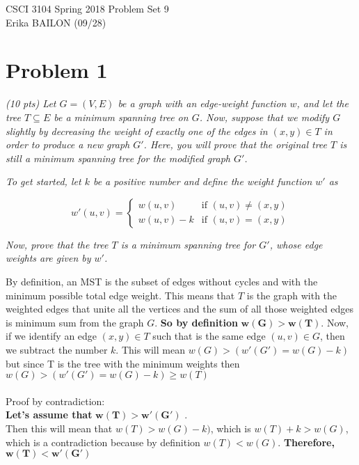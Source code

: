 \documentclass[12pt]{article} \setlength{\oddsidemargin}{0in}
\begin{document}
\noindent CSCI 3104 Spring 2018 \hfill Problem Set 9\\
Erika BAILON (09/28)

\graphicspath{ {\string~/Desktop/images/} }

\hrulefill

{\selectfont}

\section*{Problem 1}

\textit{(10 pts) Let $G = (V, E)$ be a graph with an edge-weight function $w$, and let the tree
$T \subseteq E$ be a minimum spanning tree on $G$. Now, suppose that we modify $G$ slightly by
decreasing the weight of exactly one of the edges in $(x, y) \in T$ in order to produce a
new graph $G'$. Here, you will prove that the original tree $T$ is still a minimum spanning
tree for the modified graph $G'$.}

\textit{To get started, let $k$ be a positive number and define the weight function $w'$ as}

$$
w'(u,v) =
  \begin{cases}
    w(u,v) & \text{if $(u,v) \ne (x,y)$} \\
    w(u,v)-k & \text{if $(u,v) = (x,y)$}
  \end{cases}
  $$

\textit{Now, prove that the tree $T$ is a minimum spanning tree for $G'$, whose edge weights are
given by $w'$.}

By definition, an MST is the subset of edges without cycles and with the minimum possible total edge weight. This means that $T$ is the graph with the weighted edges that unite all the vertices and the sum of all those weighted edges is minimum sum from the graph $G$. \textbf{So by definition} $\mathbf{w(G) > w(T)}$. Now, if we identify an edge $(x, y) \in T$ such that is the same edge $(u, v) \in G$, then we subtract the number $k$. This will mean  $w(G) > (w'(G') = w(G) - k)$ but since T is the tree with the minimum weights then $w(G) > (w'(G') = w(G) - k) \geq w(T)$ \\\\
Proof by contradiction: \\
\textbf{Let's assume that} $\mathbf{w(T) > w'(G')}$ . \\Then this will mean that $w(T) > w(G) - k)$, which is $w(T) + k  > w(G)$, which is a contradiction because by definition $w(T) < w(G)$. \textbf{Therefore,} $\mathbf{w(T) < w'(G')}$
\end{document}
